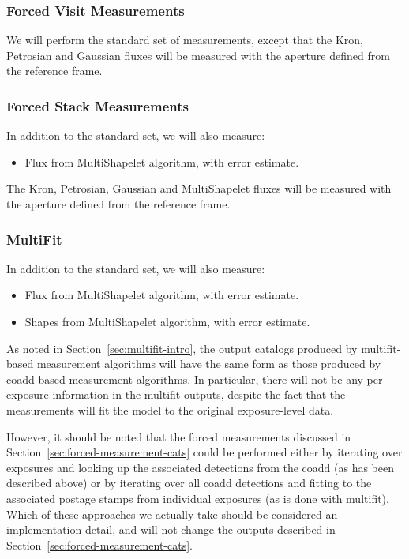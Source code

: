 \documentclass[12pt]{article}
\begin{document}
\subsubsection{Forced Visit Measurements}

We will perform the standard set of measurements, except that the Kron, Petrosian and Gaussian fluxes will be
measured with the aperture defined from the reference frame.

\subsubsection{Forced Stack Measurements}

In addition to the standard set, we will also measure:
\begin{itemize}
\item Flux from MultiShapelet algorithm, with error estimate.
\end{itemize}

The Kron, Petrosian, Gaussian and MultiShapelet fluxes will be measured with the aperture defined from the
reference frame.

\subsubsection{MultiFit}

In addition to the standard set, we will also measure:

\begin{itemize}
\item Flux from MultiShapelet algorithm, with error estimate.
\item Shapes from MultiShapelet algorithm, with error estimate.
\end{itemize}

As noted in Section~\ref{sec:multifit-intro}, the output catalogs
produced by multifit-based measurement algorithms will have the same
form as those produced by coadd-based measurement algorithms.  In
particular, there will not be any per-exposure information in the
multifit outputs, despite the fact that the measurements will fit the
model to the original exposure-level data.

However, it should be noted that the forced measurements discussed in
Section~\ref{sec:forced-measurement-cats} could be performed either by
iterating over exposures and looking up the associated detections from
the coadd (as has been described above) or by iterating over all coadd
detections and fitting to the associated postage stamps from
individual exposures (as is done with multifit).  Which of these
approaches we actually take should be considered an implementation
detail, and will not change the outputs described in
Section~\ref{sec:forced-measurement-cats}.
\end{document}
